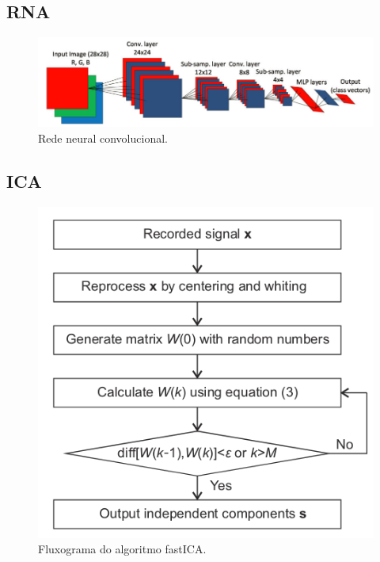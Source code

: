 % 

\subsection{RNA}

\begin{figure}[H]
    \caption{Rede neural convolucional.}
    \begin{center}
        \includegraphics[scale=.4]{referencial/img/cnn_image_ince_p5.png}
    \end{center}
    \label{fig:cnn_image_ince_p5}
\end{figure}


% 

\subsection{ICA}

\begin{figure}[H]
    \caption{Fluxograma do algoritmo fastICA.}
    \begin{center}
        \includegraphics[scale=.5]{referencial/img/fatica_fang_p3.png}
    \end{center}
    \label{fig:atica_fang_p3}
\end{figure}


